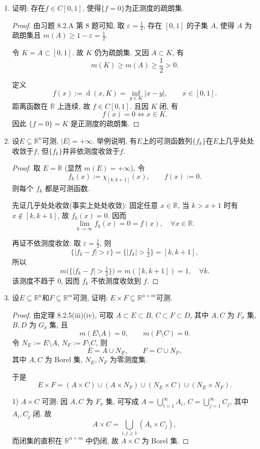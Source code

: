 \begin{quiza}
\begin{enumerate}
\item 证明: 存在\(f\in C[0,1]\), 使得\(\{f=0\}\)为正测度的疏朗集.
\begin{proof}
	由习题 8.2.A 第 8 题可知, 取 \(\varepsilon=\frac12\), 存在 \([0,1]\) 的子集 \(A\), 使得
   \(A\) 为疏朗集且 \(m(A)\ge 1-\varepsilon=\frac12\).
	
   令 \(K=\overline{A}\subset [0,1]\). 故 \(K\) 仍为疏朗集. 又因 \(A\subset K\), 有
   \[m(K)\ge m(A)\ge \frac12>0.\]
	
   定义
   \[f(x):=\operatorname{d}(x,K)=\inf_{y\in K}|x-y|,\qquad x\in[0,1].\]
   距离函数在 \(\mathbb{R}\) 上连续, 故 \(f\in C[0,1]\). 且因 \(K\) 闭, 有
   \[f(x)=0 \iff x\in K.\]
   因此 \(\{f=0\}=K\) 是正测度的疏朗集.
\end{proof}

\item 设\(E\subseteq\mathbb{R}^n\)可测, \(|E|=+\infty\). 
举例说明, 有\(E\)上的可测函数列\(\{f_k\}\)在\(E\)上几乎处处收敛于\(f\), 
但\(\{f_k\}\)并非依测度收敛于\(f\).
\begin{proof}
	取 \(E=\mathbb{R}\) (显然 \(m(E)=+\infty\)), 令
   \[f_k(x):=\chi_{[k,k+1]}(x),\qquad f(x):=0.\]
   则每个 \(f_k\) 都是可测函数.
	
   先证几乎处处收敛(事实上处处收敛): 固定任意 \(x\in\mathbb{R}\), 当
   \(k>x+1\) 时有 \(x\notin[k,k+1]\), 故 \(f_k(x)=0\). 因而
   \[\lim_{k\to\infty}f_k(x)=0=f(x),\quad \forall x\in\mathbb{R}.\]
	
   再证不依测度收敛: 取 \(\varepsilon=\frac12\), 则
   \[\{|f_k-f|>\varepsilon\}=\{|f_k|>\tfrac12\}=[k,k+1],\]
   所以
   \[m\big(\{|f_k-f|>\tfrac12\}\big)=m([k,k+1])=1,\quad \forall k.\]
   该测度不趋于 \(0\), 因而 \(f_k\) 不依测度收敛到 \(f\).
\end{proof}

\item 设\(E\subseteq\mathbb{R}^n\)和\(F\subseteq\mathbb{R}^m\)可测, 
证明: \(E\times F\subseteq\mathbb{R}^{n+m}\)可测.
\begin{proof}
	由定理 8.2.5(iii)(iv), 可取 \(A\subset E\subset B\), \(C\subset F\subset D\), 其中
   \(A,C\) 为 \(F_\sigma\) 集, \(B,D\) 为 \(G_\delta\) 集, 且
   \[m(E\setminus A)=0,\qquad m(F\setminus C)=0.\]
   令 \(N_E:=E\setminus A\), \(N_F:=F\setminus C\), 则
   \[E=A\cup N_E,\qquad F=C\cup N_F,\]
   其中 \(A,C\) 为 Borel 集, \(N_E,N_F\) 为零测度集.
	
   于是
   \[E\times F=(A\times C)\cup(A\times N_F)\cup(N_E\times C)\cup(N_E\times N_F).\]
	
   1) \(A\times C\) 可测: 因 \(A,C\) 为 \(F_\sigma\) 集, 可写成
   \(A=\bigcup_{i=1}^\infty A_i\), \(C=\bigcup_{j=1}^\infty C_j\), 其中 \(A_i,C_j\) 闭.
   故
   \[A\times C=\bigcup_{i,j\ge1}(A_i\times C_j),\]
   而闭集的直积在 \(\mathbb{R}^{n+m}\) 中仍闭, 故 \(A\times C\) 为 Borel 集.
	

\end{proof}
\end{enumerate}
\end{quiza}
